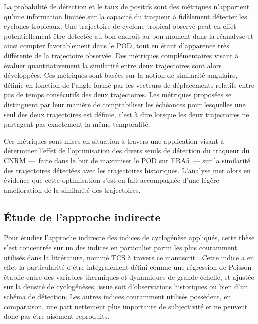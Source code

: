 \documentclass[../main.tex]{subfiles}
\begin{document}
La probabilité de détection et le taux de positifs sont des métriques n'apportent qu'une information limitée sur la capacité du traqueur à fidèlement détecter
les cyclones tropicaux. Une trajectoire de cyclone tropical observé peut en effet potentiellement être détectée au bon endroit au bon moment dans la réanalyse
et ainsi compter favorablement dans le POD, tout en étant d'apparence très différente de la trajectoire observée. Des métriques complémentaires visant à évaluer
quantitativement la similarité entre deux trajectoires sont alors développées. Ces métriques sont basées sur la notion de similarité angulaire, définie en
fonction de l'angle formé par les vecteurs de déplacements relatifs entre pas de temps consécutifs des deux trajectoires. Les métriques proposées se distinguent
par leur manière de comptabiliser les échéances pour lesquelles une seul des deux trajectoires est définie, c'est à dire lorsque les deux trajectoires ne
partagent pas exactement la même temporalité. 

Ces métriques sont mises en situation à travers une application visant à déterminer l'effet de l'optimisation des divers seuils de détection du traqueur du CNRM
---~faite dans le but de maximiser le POD sur ERA5~--- sur la similarité des trajectoires détectées avec les trajectoires historiques. L'analyse met alors en
évidence que cette optimisation s'est en fait accompagnée d'une légère amélioration de la similarité des trajectoires.

\subsection*{Étude de l'approche indirecte}

Pour étudier l'approche indirecte des indices de cyclogénèse appliqués, cette thèse s'est concentrée sur un des indices en particulier parmi les plus couramment
utilisés dans la littérature, nommé TCS à travers ce manuscrit \parencite{tippett_poisson_2011}. Cette indice a en effet la particularité d'être intégralement
défini comme une régression de Poisson établie entre des variables thermiques et dynamiques de grande échelle, et ajustée sur la densité de cyclogénèses, issue
soit d'observations historiques ou bien d'un schéma de détection. Les autres indices couramment utilisés possèdent, en comparaison, une part nettement plus
importante de subjectivité et ne peuvent donc pas être aisément reproduits.
\end{document}
